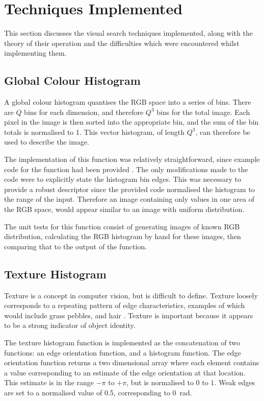 \section{Techniques Implemented} \label{sec:techniques-implemented}
This section discusses the visual search techniques implemented, along with the theory of their operation and the difficulties which were encountered whilst implementing them.
\subsection{Global Colour Histogram} \label{sec:color-histogram}
A global colour histogram quantises the RGB space into a series of bins. There are $Q$ bins for each dimension, and therefore $Q^3$ bins for the total image. Each pixel in the image is then sorted into the appropriate bin, and the sum of the bin totals is normalised to 1. This vector histogram, of length $Q^3$, can therefore be used to describe the image.

The implementation of this function was relatively straightforward, since example code for the function had been provided \cite{collomosse2016}. The only modifications made to the code were to explicitly state the histogram bin edges. This was necessary to provide a robust descriptor since the provided code normalised the histogram to the range of the input. Therefore an image containing only values in one area of the RGB space, would appear similar to an image with uniform distribution.

The unit tests for this function consist of generating images of known RGB distribution, calculating the RGB histogram by hand for these images, then comparing that to the output of the function.
\subsection{Texture Histogram} \label{sec:texture-histogram}
Texture is a concept in computer vision, but is difficult to define. Texture loosely corresponds to a repeating pattern of edge characteristics, examples of which would include grass pebbles, and hair \cite[p. 194]{forsyth2012}. Texture is important because it appears to be a strong indicator of object identity.

The texture histogram function is implemented as the concatenation of two functions: an edge orientation function, and a histogram function. The edge orientation function returns a two dimensional array where each element contains a value corresponding to an estimate of the edge orientation at that location. This estimate is in the range $-\pi$ to $+\pi$, but is normalised to $0$ to $1$. Weak edges are set to a normalised value of 0.5, corresponding to \SI{0}{\radian}.


